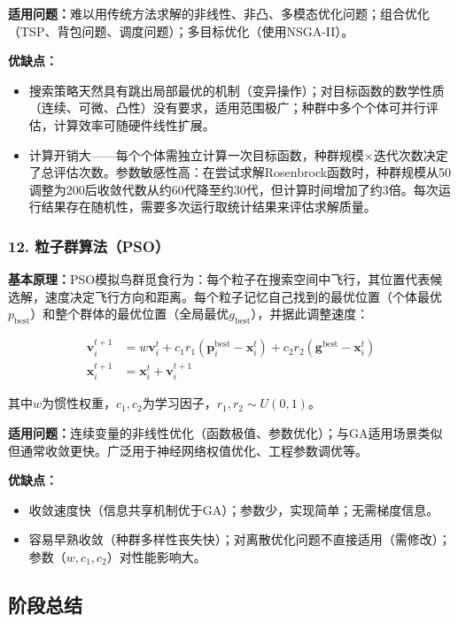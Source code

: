 \documentclass[12pt,a4paper]{ctexart}
\begin{document}
\textbf{适用问题：}难以用传统方法求解的非线性、非凸、多模态优化问题；组合优化（TSP、背包问题、调度问题）；多目标优化（使用NSGA-II）。

\textbf{优缺点：}
\begin{itemize}[leftmargin=*]
    \item[+] 搜索策略天然具有跳出局部最优的机制（变异操作）；对目标函数的数学性质（连续、可微、凸性）没有要求，适用范围极广；种群中多个个体可并行评估，计算效率可随硬件线性扩展。
    \item[$-$] 计算开销大——每个个体需独立计算一次目标函数，种群规模$\times$迭代次数决定了总评估次数。参数敏感性高：在尝试求解Rosenbrock函数时，种群规模从50调整为200后收敛代数从约60代降至约30代，但计算时间增加了约3倍。每次运行结果存在随机性，需要多次运行取统计结果来评估求解质量。
\end{itemize}

\subsubsection{12. 粒子群算法（PSO）}

\textbf{基本原理：}PSO模拟鸟群觅食行为：每个粒子在搜索空间中飞行，其位置代表候选解，速度决定飞行方向和距离。每个粒子记忆自己找到的最优位置（个体最优$p_{\text{best}}$）和整个群体的最优位置（全局最优$g_{\text{best}}$），并据此调整速度：

\begin{align}
\mathbf{v}_i^{t+1} &= w\mathbf{v}_i^t + c_1 r_1(\mathbf{p}_i^{\text{best}} - \mathbf{x}_i^t) + c_2 r_2(\mathbf{g}^{\text{best}} - \mathbf{x}_i^t) \\
\mathbf{x}_i^{t+1} &= \mathbf{x}_i^t + \mathbf{v}_i^{t+1}
\end{align}

其中$w$为惯性权重，$c_1, c_2$为学习因子，$r_1, r_2 \sim U(0,1)$。

\textbf{适用问题：}连续变量的非线性优化（函数极值、参数优化）；与GA适用场景类似但通常收敛更快。广泛用于神经网络权值优化、工程参数调优等。

\textbf{优缺点：}
\begin{itemize}[leftmargin=*]
    \item[+] 收敛速度快（信息共享机制优于GA）；参数少，实现简单；无需梯度信息。
    \item[$-$] 容易早熟收敛（种群多样性丧失快）；对离散优化问题不直接适用（需修改）；参数（$w, c_1, c_2$）对性能影响大。
\end{itemize}

\subsection{阶段总结}
\end{document}
